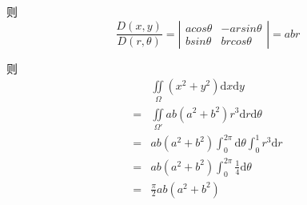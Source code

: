 \documentclass[UTF8]{ctexart}
\begin{document}
则\[
\frac{D(x,y)}{D(r,\theta)} = \left| \begin{array}{cccc}
    acos\theta & -arsin\theta \\
    bsin\theta & brcos\theta
\end{array}\right|
= abr
\]

则
\begin{align*}
    &\iint \limits_{\Omega} (x^2 + y^2)\mathrm{d}x \mathrm{d}y\\
    =& \iint \limits_{\Omega'} ab(a^2 + b^2)r^3 \mathrm{d}r \mathrm{d}\theta\\
    =& ab(a^2+b^2)\int_{0}^{2\pi} \mathrm{d}\theta \int_{0}^{1}  r^3 \mathrm{d}r\\
    =& ab(a^2+b^2)\int_{0}^{2\pi}  \frac{1}{4} \mathrm{d}\theta\\
    =& \frac{\pi}{2}ab(a^2+b^2)  \\
\end{align*}
\end{document}
